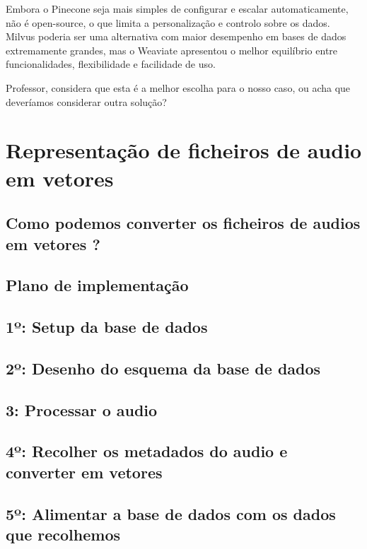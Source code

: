 \documentclass{article}
\begin{document}
Embora o Pinecone seja mais simples de configurar e escalar automaticamente, não é open-source, o que limita a personalização e controlo sobre os dados. Milvus poderia ser uma alternativa com maior desempenho em bases de dados extremamente grandes, mas o Weaviate apresentou o melhor equilíbrio entre funcionalidades, flexibilidade e facilidade de uso.

Professor, considera que esta é a melhor escolha para o nosso caso, ou acha que deveríamos considerar outra solução?

\section{Representação de ficheiros de audio em vetores}

\subsection{Como podemos converter os ficheiros de audios em vetores ?}

\subsection{Plano de implementação}



\subsection{1º: Setup da base de dados}


\subsection{2º: Desenho do esquema da base de dados}


\subsection{3: Processar o audio}



\subsection{4º: Recolher os metadados do audio e converter em vetores}

\subsection{5º: Alimentar a base de dados com os dados que recolhemos }
\end{document}
